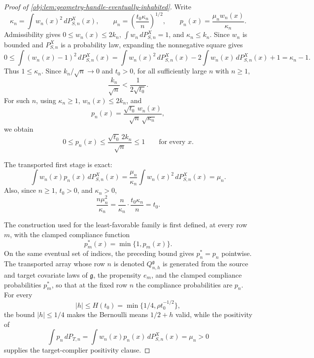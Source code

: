 \begin{proof}[Proof of \cref{obj:lem:geometry-handle-eventually-inhabited}]
Write
\[
\kappa_n=\int w_n(x)^2\,dP_{S,n}^X(x),
\qquad
\mu_n=\left(\frac{t_0\kappa_n}{n}\right)^{1/2},
\qquad
p_n(x)=\frac{\mu_n w_n(x)}{\kappa_n}.
\]
Admissibility gives \(0\le w_n(x)\le 2k_n\), \(\int w_n\,dP_{S,n}^X=1\), and \(\kappa_n\le k_n\). Since \(w_n\) is bounded and \(P_{S,n}^X\) is a probability law, expanding the nonnegative square gives
\[
0
\le
\int (w_n(x)-1)^2\,dP_{S,n}^X(x)
=
\int w_n(x)^2\,dP_{S,n}^X(x)
-2\int w_n(x)\,dP_{S,n}^X(x)+1
=
\kappa_n-1 .
\] %
Thus \(1\le \kappa_n\). Since \(k_n/\sqrt n\to0\) and \(t_0>0\), for all sufficiently large \(n\) with \(n\ge1\),
\[
\frac{k_n}{\sqrt n}<\frac1{2\sqrt{t_0}} .
\] %
For such \(n\), using \(\kappa_n\ge1\), \(w_n(x)\le2k_n\), and
\[
p_n(x)
=
\frac{\sqrt{t_0}\,w_n(x)}
{\sqrt n\,\sqrt{\kappa_n}},
\]
we obtain
\[
0\le p_n(x)
\le
\frac{\sqrt{t_0}\,2k_n}{\sqrt n}
\le 1
\qquad\text{for every }x .
\] %

The transported first stage is exact:
\[
\int w_n(x)p_n(x)\,dP_{S,n}^X(x)
=
\frac{\mu_n}{\kappa_n}
\int w_n(x)^2\,dP_{S,n}^X(x)
=
\mu_n .
\] %
Also, since \(n\ge1\), \(t_0>0\), and \(\kappa_n>0\),
\[
\frac{n\mu_n^2}{\kappa_n}
=
\frac{n}{\kappa_n}\cdot \frac{t_0\kappa_n}{n}
=
t_0 .
\] %

The construction used for the least-favorable family is first defined, at every row \(m\), with the clamped compliance function
\[
p_m^\ast(x)=\min\{1,p_m(x)\}.
\]
On the same eventual set of indices, the preceding bound gives \(p_n^\ast=p_n\) pointwise. The transported array whose row \(n\) is denoted \(Q_{n,h}^{\mathfrak g}\) is generated from the source and target covariate laws of \(\mathfrak g\), the propensity \(e_m\), and the clamped compliance probabilities \(p_m^\ast\), so that at the fixed row \(n\) the compliance probabilities are \(p_n\). For every
\[
|h|\le H(t_0)=\min\{1/4,\rho t_0^{-1/2}\},
\]
the bound \(|h|\le1/4\) makes the Bernoulli means \(1/2+h\) valid, while the positivity of
\[
\int p_n\,dP_{T,n}
=
\int w_n(x)p_n(x)\,dP_{S,n}^X(x)
=
\mu_n
>
0
\]
supplies the target-complier positivity clause.


\end{proof}
